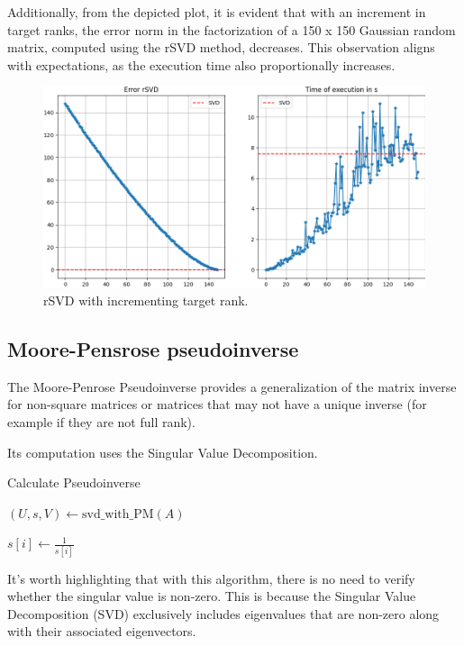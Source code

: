 \documentclass{article}
\begin{document}
Additionally, from the depicted plot, it is evident that with an increment in target ranks, the error norm in the factorization of a 150 x 150 Gaussian random matrix, computed using the rSVD method, decreases. This observation aligns with expectations, as the execution time also proportionally increases.

\begin{figure}[h]
    \centering
    \includegraphics[width=0.55\linewidth]{rsvd.png}
    \caption{\label{pca1}rSVD with incrementing target rank.}
    \end{figure}


    \subsection{Moore-Pensrose pseudoinverse}
    The Moore-Penrose Pseudoinverse provides a generalization of the matrix inverse for non-square matrices or matrices that may not have a unique inverse (for example if they are not full rank).  
    
    Its computation uses the Singular Value Decomposition.
    
    \begin{algorithm}
    \caption{Calculate Pseudoinverse}
    \begin{algorithmic}[1]
        \State {}
        \State $(U, s, V) \gets \text{svd\_with\_PM}(A)$
    
         
            \State $s[i] \gets \frac{1}{s[i]}$  
        \EndFor
    
    \EndFunction
    \end{algorithmic}
    \end{algorithm}
    
    It's worth highlighting that with this algorithm, there is no need to verify whether the singular value is non-zero. This is because the Singular Value Decomposition (SVD) exclusively includes eigenvalues that are non-zero along with their associated eigenvectors.
\newpage
\end{document}
